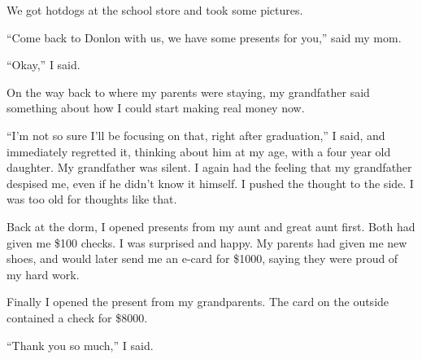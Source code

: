 We got hotdogs at the school store and took some pictures.  

``Come back to Donlon with us, we have some presents for you,'' said my mom. 

``Okay,'' I said.  

On the way back to where my parents were staying, my grandfather said something
about how I could start making real money now.

``I'm not so sure I'll be focusing on that, right after graduation,'' I said,
and immediately regretted it, thinking about him at my age, with a four year old
daughter.  My grandfather was silent.  I again had the feeling that my
grandfather despised me, even if he didn't know it himself.  I pushed the
thought to the side.  I was too old for thoughts like that.

Back at the dorm, I opened presents from my aunt and great aunt first.  Both had
given me \$100 checks.  I was surprised and happy.  My parents had given me new
shoes, and would later send me an e-card for \$1000, saying they were proud of
my hard work.  

Finally I opened the present from my grandparents.  The card on the outside
contained a check for \$8000.  

``Thank you so much,'' I said.

